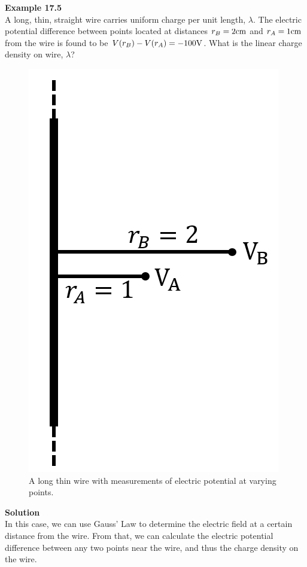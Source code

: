 \begin{framed}
\textbf{Example 17.5}\\
A long, thin, straight wire carries uniform charge per unit length, $\lambda$. The electric potential difference between points located at distances $r_B=2 {\rm cm}$ and $r_A=1 {\rm cm}$ from the wire is found to be $V(r_B) -V(r_A)= -100 {\rm V}$. What is the linear charge density on wire, $\lambda$?

\begin{figure}[!htbp]
\centering
\includegraphics[width=0.2\linewidth]{files/infinitewire-99f6a9acd349bbbe385425382255e9eb.png}
\caption[]{A long thin wire with measurements of electric potential at varying points.}
\label{fig:potential:infinitewire}
\end{figure}

\begin{framed}
\textbf{Solution}\\
In this case, we can use Gauss' Law to determine the electric field at a certain distance from the wire. From that, we can calculate the electric potential difference between any two points near the wire, and thus the charge density on the wire.


\end{framed}
\end{framed}
